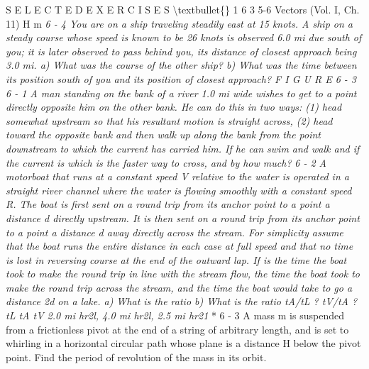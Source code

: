 \documentclass[10pt,oneside]{article}
\begin{document}
S E L E C T E D  E X E R C I S E S \textbackslash{}textbullet\{\} 1 6 3 5-6 Vectors (Vol. I, Ch. 11) H m \emph{ } \emph{ 6 - 4 You are on a ship traveling steadily east at 15 knots. A ship on a steady course whose speed is known to be 26 knots is observed 6.0 mi due south of you; it is later observed to pass behind you, its distance of closest approach being 3.0 mi. a) What was the course of the other ship? b) What was the time between its position south of you and its position of closest approach? F I G U R E  6 - 3 } \emph{ 6 - 1 A man standing on the bank of a river 1.0 mi wide wishes to get to a point directly opposite him on the other bank. He can do this in two ways: (1) head somewhat upstream so that his resultant motion is straight across, (2) head toward the opposite bank and then walk up along the bank from the point downstream to which the current has carried him. If he can swim and walk and if the current is which is the faster way to cross, and by how much? } \emph{ 6 - 2 A motorboat that runs at a constant speed V relative to the water is operated in a straight river channel where the water is flowing smoothly with a constant speed R. The boat is first sent on a round trip from its anchor point to a point a distance d directly upstream. It is then sent on a round trip from its anchor point to a point a distance d away directly across the stream. For simplicity assume that the boat runs the entire distance in each case at full speed and that no time is lost in reversing course at the end of the outward lap. If is the time the boat took to make the round trip in line with the stream flow, the time the boat took to make the round trip across the stream, and the time the boat would take to go a distance 2d on a lake. a) What is the ratio b) What is the ratio tA/tL ? tV/tA ? tL tA tV 2.0 mi hr2l, 4.0 mi hr2l, 2.5 mi hr21 } * 6 - 3 A mass m is suspended from a frictionless pivot at the end of a string of arbitrary length, and is set to whirling in a horizontal circular path whose plane is a distance H below the pivot point. Find the period of revolution of the mass in its orbit.\par
\end{document}
